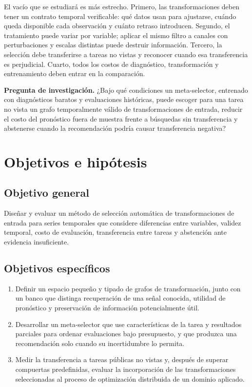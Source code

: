 \documentclass[11pt,letterpaper]{article}
\begin{document}
El vacío que se estudiará es más estrecho.
Primero, las transformaciones deben tener un contrato temporal verificable: qué datos usan para ajustarse, cuándo queda disponible cada observación y cuánto retraso introducen.
Segundo, el tratamiento puede variar por variable; aplicar el mismo filtro a canales con perturbaciones y escalas distintas puede destruir información.
Tercero, la selección debe transferirse a tareas no vistas y reconocer cuando esa transferencia es perjudicial.
Cuarto, todos los costos de diagnóstico, transformación y entrenamiento deben entrar en la comparación.

\begin{tcolorbox}[colback=soft,colframe=accent,boxrule=0.6pt,arc=1.2pt,left=6pt,right=6pt,top=5pt,bottom=5pt]
\textbf{Pregunta de investigación.}
¿Bajo qué condiciones un meta-selector, entrenado con diagnósticos baratos y evaluaciones históricas, puede escoger para una tarea no vista un grafo temporalmente válido de transformaciones de entrada, reducir el costo del pronóstico fuera de muestra frente a búsquedas sin transferencia y abstenerse cuando la recomendación podría causar transferencia negativa?
\end{tcolorbox}

\section{Objetivos e hipótesis}

\subsection{Objetivo general}

Diseñar y evaluar un método de selección automática de transformaciones de entrada para series temporales que considere diferencias entre variables, validez temporal, costo de evaluación, transferencia entre tareas y abstención ante evidencia insuficiente.

\subsection{Objetivos específicos}

\begin{enumerate}
  \item Definir un espacio pequeño y tipado de grafos de transformación, junto con un banco que distinga recuperación de una señal conocida, utilidad de pronóstico y preservación de información potencialmente útil.
  \item Desarrollar un meta-selector que use características de la tarea y resultados parciales para ordenar evaluaciones bajo presupuesto, y que produzca una recomendación solo cuando su incertidumbre lo permita.
  \item Medir la transferencia a tareas públicas no vistas y, después de superar compuertas predefinidas, evaluar la incorporación de las transformaciones seleccionadas al proceso de optimización distribuida de un dominio aplicado.
\end{enumerate}
\end{document}
